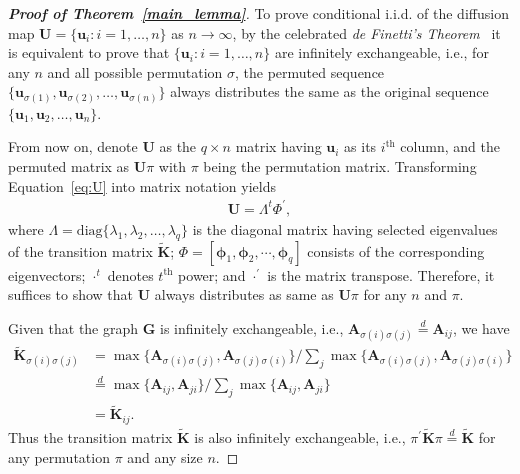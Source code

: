 \documentclass[12pt]{article}
\theoremstyle{definition}
\begin{document}
	\begin{proof}[\textbf{Proof of Theorem~\ref{main_lemma}}]
		To prove conditional i.i.d. of the diffusion map $\mathbf{U} = \{\mathbf{u}_i : i=1,\ldots,n\}$ as $n \rightarrow \infty$, by the celebrated \textit{de Finetti's Theorem}~\citep{diaconis1980finite,orbanz2015bayesian} it is equivalent to prove that $\{ \mathbf{u}_i : i=1,\ldots,n \}$ are infinitely exchangeable, i.e., for any $n$ and all possible permutation $\sigma$, the permuted sequence $\{\mathbf{u}_{\sigma(1)}, \mathbf{u}_{\sigma(2)}, \ldots,\mathbf{u}_{\sigma(n)}\}$ always distributes the same as the original sequence $\{\mathbf{u}_{1}, \mathbf{u}_{2}, \ldots,\mathbf{u}_{n}\}$.
		
		From now on, denote $\mathbf{U}$ as the $q \times n$ matrix having $\mathbf{u}_i$ as its $i^{\mbox{th}}$ column, and the permuted matrix as $\mathbf{U} \pi$ with $\pi$ being the permutation matrix. Transforming Equation~\ref{eq:U} into matrix notation yields
		\begin{align*}
			\mathbf{U}=\Lambda^{t}\Phi^{'},
		\end{align*}
		where $\Lambda=\mbox{diag} \{ \lambda_{1},\lambda_2,\ldots,\lambda_q \}$ is the diagonal matrix having selected eigenvalues of the transition matrix $\mathbf{\widetilde{K}}$; $\Phi =[ \mathbf{\phi}_1, \mathbf{\phi}_2,\cdots, \mathbf{\phi}_q ]$ consists of the corresponding eigenvectors; $\cdot^{t}$ denotes $t^{\mbox{th}}$ power; and $\cdot^{'}$ is the matrix transpose. Therefore, it suffices to show that $\mathbf{U}$ always distributes as same as $\mathbf{U} \pi$ for any $n$ and $\pi$.
		
		Given that the graph $\mathbf{G}$ is infinitely exchangeable, i.e., $\mathbf{A}_{\sigma(i)\sigma(j)} \stackrel{d}{=} \mathbf{A}_{ij}$, we have
		\begin{align*}
			\mathbf{\widetilde{K}}_{\sigma(i) \sigma(j)} &= \max\{\mathbf{A}_{\sigma(i) \sigma(j)},\mathbf{A}_{\sigma(j) \sigma(i)}\} / \sum\limits_{j} \max\{\mathbf{A}_{\sigma(i) \sigma(j)},\mathbf{A}_{\sigma(j) \sigma(i)}\} \\
			&\stackrel{d}{=} \max\{\mathbf{A}_{ij},\mathbf{A}_{ji}\} / \sum\limits_{j} \max\{\mathbf{A}_{ij},\mathbf{A}_{ji}\} \\
			&= \mathbf{\widetilde{K}}_{ij}.
		\end{align*}
		Thus the transition matrix $\mathbf{\widetilde{K}}$ is also infinitely exchangeable, i.e., $\pi^{'} \mathbf{\widetilde{K}} \pi \stackrel{d}{=} \mathbf{\widetilde{K}}$ for any permutation $\pi$ and any size $n$. 
		

\end{proof}
\end{document}
